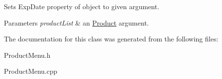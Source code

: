 \begin{DoxyItemize}
\item Sets Exp\+Date property of object to given argument.
\end{DoxyItemize}


\begin{DoxyParams}{Parameters}
{\em product\+List} & an \hyperlink{classProduct}{Product} argument. \\
\hline
\end{DoxyParams}


The documentation for this class was generated from the following files\+:\begin{DoxyCompactItemize}
\item 
Product\+Menu.\+h\item 
Product\+Menu.\+cpp\end{DoxyCompactItemize}
